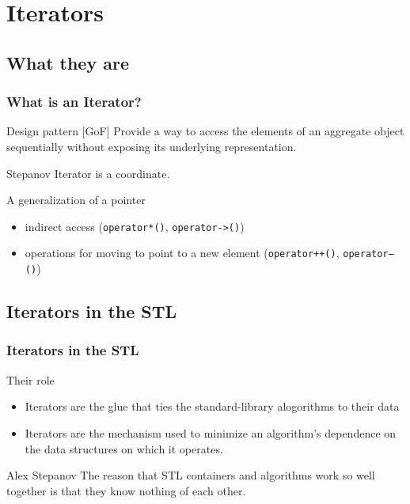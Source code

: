 \section{Iterators}
\subsection{What they are}
\begin{frame}
  \frametitle{What is an Iterator?}
  \begin{block}{Design pattern [GoF]}
    Provide a way to access the elements of an aggregate object sequentially without exposing its underlying representation.
  \end{block}
  \vfill
  \begin{block}{Stepanov}
    Iterator is a coordinate.
  \end{block}
  \vfill
  \begin{block}{A generalization of a pointer}
    \begin{itemize}
    \item indirect access (\texttt{operator*()}, \texttt{operator->()})
    \item operations for moving to point to a new element (\texttt{operator++()}, \texttt{operator--()}) 
    \end{itemize}
  \end{block}
\end{frame}

\subsection{Iterators in the STL}

\begin{frame}
  \frametitle{Iterators in the STL}
  \begin{block}{Their role}
    \begin{itemize}
    \item Iterators are the glue that ties the standard-library alogorithms to their data
    \item Iterators are the mechanism used to minimize an algorithm's dependence on the data structures on which it operates.
      \end{itemize}
  \end{block}
\vfill
  \begin{block}{Alex Stepanov}
    The reason that STL containers and algorithms work so well together is that they know nothing of each other.
    \end{block}
\end{frame}

